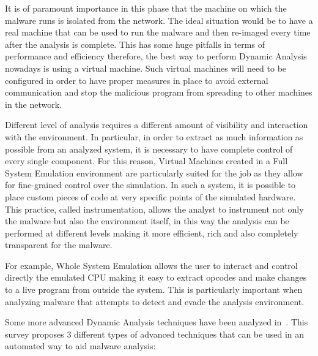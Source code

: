It is of paramount importance in this phase that the machine on which the malware runs is isolated from the network. The ideal situation would be to have a real machine that can be used to run the malware and then re-imaged every time after the analysis is complete. This has some huge pitfalls in terms of performance and efficiency therefore, the best way to perform Dynamic Analysis nowadays is using a virtual machine. Such virtual machines will need to be configured in order to have proper measures in place to avoid external communication and stop the malicious program from spreading to other machines in the network. 

Different level of analysis requires a different amount of visibility and interaction with the environment. In particular, in order to extract as much information as possible from an analyzed system, it is necessary to have complete control of every single component. For this reason, Virtual Machines created in a Full System Emulation environment are particularly suited for the job as they allow for fine-grained control over the simulation. In such a system, it is possible to place custom pieces of code at very specific points of the simulated hardware. This practice, called instrumentation, allows the analyst to instrument not only the malware but also the environment itself, in this way the analysis can be performed at different levels making it more efficient, rich and also completely transparent for the malware.

For example, Whole System Emulation allows the user to interact and control directly the emulated CPU making it easy to extract opcodes and make changes to a live program from outside the system. This is particularly important when analyzing malware that attempts to detect and evade the analysis environment. 

Some more advanced Dynamic Analysis techniques have been analyzed in~\cite{10.1145/2089125.2089126}. This survey proposes 3 different types of advanced techniques that can be used in an automated way to aid malware analysis:

